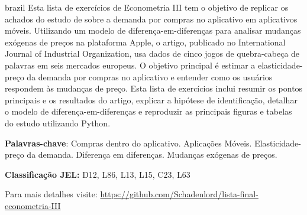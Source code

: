 \documentclass[
	article,
	12pt,
	oneside,
	a4paper,
	english,
	brazil,
	sumario=tradicional
]{abntex2}
\begin{document}
\renewcommand{\resumoname}{Resumo}
\begin{resumoumacoluna}
\begin{otherlanguage*}{brazil}
   \noindent 
   Esta lista de exercícios de Econometria III tem o objetivo de replicar os achados do estudo de \cite{ENACHE2023102945} sobre a demanda por compras no aplicativo em aplicativos móveis. Utilizando um modelo de diferença-em-diferenças para analisar mudanças exógenas de preços na plataforma Apple, o artigo, publicado no International Journal of Industrial Organization, usa dados de cinco jogos de quebra-cabeça de palavras em seis mercados europeus. O objetivo principal é estimar a elasticidade-preço da demanda por compras no aplicativo e entender como os usuários respondem às mudanças de preço. Esta lista de exercícios inclui resumir os pontos principais e os resultados do artigo, explicar a hipótese de identificação, detalhar o modelo de diferença-em-diferenças e reproduzir as principais figuras e tabelas do estudo utilizando Python. 
   
   \textbf{Palavras-chave}: Compras dentro do aplicativo. Aplicações Móveis. Elasticidade-preço da demanda. Diferença em diferenças. Mudanças exógenas de preços.
   
   \textbf{Classificação JEL:  }D12, L86, L13, L15, C23, L63

   Para mais detalhes visite: \url{https://github.com/Schadenlord/lista-final-econometria-III}

 \end{otherlanguage*}  
\end{resumoumacoluna}

\newpage


\textual



\postextual
\renewcommand{\refname}{Referências}



%
\end{document}
